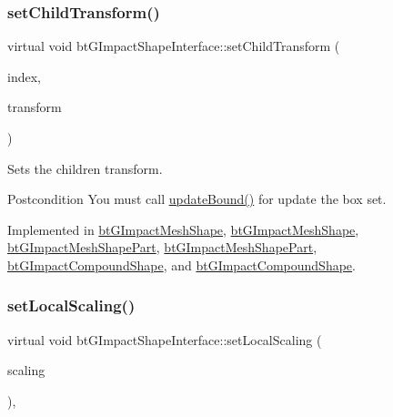 \subsubsection{\texorpdfstring{set\+Child\+Transform()}{setChildTransform()}\hspace{0.1cm}{\footnotesize\ttfamily [2/2]}}
{\footnotesize\ttfamily virtual void bt\+G\+Impact\+Shape\+Interface\+::set\+Child\+Transform (\begin{DoxyParamCaption}\item[{int}]{index,  }\item[{const bt\+Transform \&}]{transform }\end{DoxyParamCaption})\hspace{0.3cm}{\ttfamily [pure virtual]}}



Sets the children transform. 

\begin{DoxyPostcond}{Postcondition}
You must call \hyperlink{classbtGImpactShapeInterface_acb26c2d7a2aecabd06b996b72b848492}{update\+Bound()} for update the box set. 
\end{DoxyPostcond}


Implemented in \hyperlink{classbtGImpactMeshShape_a274feed3c9a38a6af5c9f1141ae9ac1a}{bt\+G\+Impact\+Mesh\+Shape}, \hyperlink{classbtGImpactMeshShape_a274feed3c9a38a6af5c9f1141ae9ac1a}{bt\+G\+Impact\+Mesh\+Shape}, \hyperlink{classbtGImpactMeshShapePart_a0a97d3769fb7d3f583e41da6b284bcc1}{bt\+G\+Impact\+Mesh\+Shape\+Part}, \hyperlink{classbtGImpactMeshShapePart_a0a97d3769fb7d3f583e41da6b284bcc1}{bt\+G\+Impact\+Mesh\+Shape\+Part}, \hyperlink{classbtGImpactCompoundShape_a560410e20842ad73227d7712a574385c}{bt\+G\+Impact\+Compound\+Shape}, and \hyperlink{classbtGImpactCompoundShape_a560410e20842ad73227d7712a574385c}{bt\+G\+Impact\+Compound\+Shape}.

\mbox{\label{classbtGImpactShapeInterface_adec0bd43cd0105b1d0dc172bc7db50d8}} 
\subsubsection{\texorpdfstring{set\+Local\+Scaling()}{setLocalScaling()}\hspace{0.1cm}{\footnotesize\ttfamily [1/2]}}
{\footnotesize\ttfamily virtual void bt\+G\+Impact\+Shape\+Interface\+::set\+Local\+Scaling (\begin{DoxyParamCaption}\item[{const bt\+Vector3 \&}]{scaling }\end{DoxyParamCaption})\hspace{0.3cm}{\ttfamily [inline]}, {\ttfamily [virtual]}}

